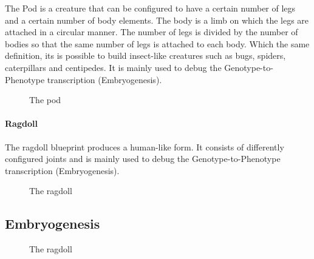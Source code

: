 \documentclass[main]{subfiles}
\begin{document}
The Pod is a creature that can be configured to have a certain number of legs and a certain number of body elements. The body is a limb on which the legs are attached in a circular manner. The number of legs is divided by the number of bodies so that the same number of legs is attached to each body. Which the same definition, its is possible to build insect-like creatures such as bugs, spiders, caterpillars and centipedes. It is mainly used to debug the Genotype-to-Phenotype transcription (Embryogenesis).

\begin{figure}[!h]
\centering
{}
\caption{The pod}
\label{figure:pod}
\end{figure}


\paragraph{Ragdoll}

The ragdoll blueprint produces a human-like form. It consists of differently configured joints and is mainly used to debug the Genotype-to-Phenotype transcription (Embryogenesis).

\begin{figure}[!h]
\centering
{}
\caption{The ragdoll}
\label{figure:ragdoll}
\end{figure}


\subsection{Embryogenesis}

\begin{figure}[!h]
\centering
{}
\caption{The ragdoll}
\label{figure:ragdoll}
\end{figure}
\end{document}
